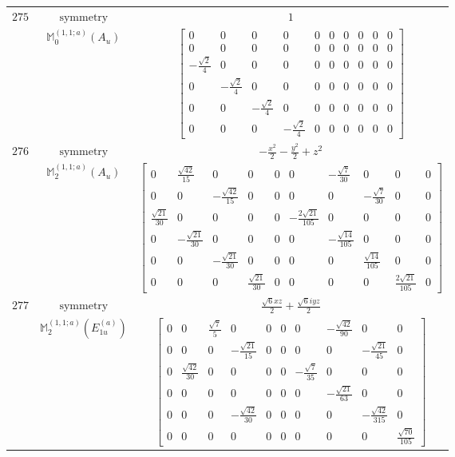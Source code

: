 \documentclass[fleqn,8pt,landscape]{jsarticle}
\begin{document}
\begin{longtable}{ccc}
$ 275 $ & $ \text{symmetry} $ & $ 1 $ \\
$  $ & $ \mathbb{M}_{0}^{(1,1;a)}(A_{u}) $ & $ \begin{bmatrix} 0 & 0 & 0 & 0 & 0 & 0 & 0 & 0 & 0 & 0 \\ 0 & 0 & 0 & 0 & 0 & 0 & 0 & 0 & 0 & 0 \\ - \frac{\sqrt{2}}{4} & 0 & 0 & 0 & 0 & 0 & 0 & 0 & 0 & 0 \\ 0 & - \frac{\sqrt{2}}{4} & 0 & 0 & 0 & 0 & 0 & 0 & 0 & 0 \\ 0 & 0 & - \frac{\sqrt{2}}{4} & 0 & 0 & 0 & 0 & 0 & 0 & 0 \\ 0 & 0 & 0 & - \frac{\sqrt{2}}{4} & 0 & 0 & 0 & 0 & 0 & 0 \end{bmatrix} $ \\ \hline
$ 276 $ & $ \text{symmetry} $ & $ - \frac{x^{2}}{2} - \frac{y^{2}}{2} + z^{2} $ \\
$  $ & $ \mathbb{M}_{2}^{(1,1;a)}(A_{u}) $ & $ \begin{bmatrix} 0 & \frac{\sqrt{42}}{15} & 0 & 0 & 0 & 0 & - \frac{\sqrt{7}}{30} & 0 & 0 & 0 \\ 0 & 0 & - \frac{\sqrt{42}}{15} & 0 & 0 & 0 & 0 & - \frac{\sqrt{7}}{30} & 0 & 0 \\ \frac{\sqrt{21}}{30} & 0 & 0 & 0 & 0 & - \frac{2 \sqrt{21}}{105} & 0 & 0 & 0 & 0 \\ 0 & - \frac{\sqrt{21}}{30} & 0 & 0 & 0 & 0 & - \frac{\sqrt{14}}{105} & 0 & 0 & 0 \\ 0 & 0 & - \frac{\sqrt{21}}{30} & 0 & 0 & 0 & 0 & \frac{\sqrt{14}}{105} & 0 & 0 \\ 0 & 0 & 0 & \frac{\sqrt{21}}{30} & 0 & 0 & 0 & 0 & \frac{2 \sqrt{21}}{105} & 0 \end{bmatrix} $ \\ \hline
$ 277 $ & $ \text{symmetry} $ & $ \frac{\sqrt{6} x z}{2} + \frac{\sqrt{6} i y z}{2} $ \\
$  $ & $ \mathbb{M}_{2}^{(1,1;a)}(E_{1u}^{(a)}) $ & $ \begin{bmatrix} 0 & 0 & \frac{\sqrt{7}}{5} & 0 & 0 & 0 & 0 & - \frac{\sqrt{42}}{90} & 0 & 0 \\ 0 & 0 & 0 & - \frac{\sqrt{21}}{15} & 0 & 0 & 0 & 0 & - \frac{\sqrt{21}}{45} & 0 \\ 0 & \frac{\sqrt{42}}{30} & 0 & 0 & 0 & 0 & - \frac{\sqrt{7}}{35} & 0 & 0 & 0 \\ 0 & 0 & 0 & 0 & 0 & 0 & 0 & - \frac{\sqrt{21}}{63} & 0 & 0 \\ 0 & 0 & 0 & - \frac{\sqrt{42}}{30} & 0 & 0 & 0 & 0 & - \frac{\sqrt{42}}{315} & 0 \\ 0 & 0 & 0 & 0 & 0 & 0 & 0 & 0 & 0 & \frac{\sqrt{70}}{105} \end{bmatrix} $ \\ \hline

\end{longtable}
\end{document}
